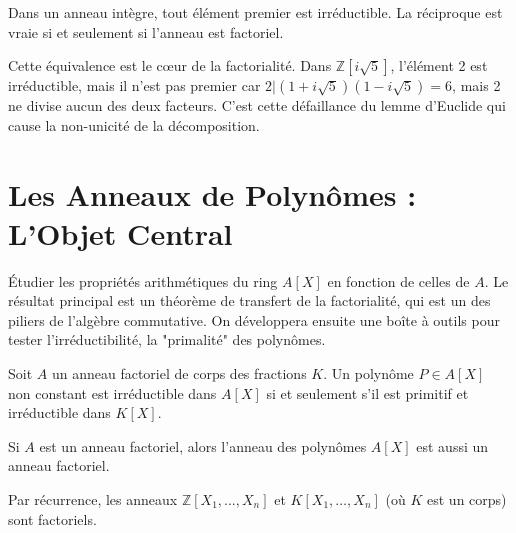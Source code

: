 \begin{proposition}
    Dans un anneau intègre, tout élément premier est irréductible. La réciproque est vraie si et seulement si l'anneau est factoriel.
\end{proposition}

\begin{remark}
    Cette équivalence est le cœur de la factorialité. Dans $\mathbb{Z}[i\sqrt{5}]$, l'élément 2 est irréductible, mais il n'est pas premier car $2 | (1+i\sqrt{5})(1-i\sqrt{5})=6$, mais 2 ne divise aucun des deux facteurs. C'est cette défaillance du lemme d'Euclide qui cause la non-unicité de la décomposition.
\end{remark}

\section{Les Anneaux de Polynômes : L'Objet Central}

\begin{objectif}
    Étudier les propriétés arithmétiques du ring $A[X]$ en fonction de celles de $A$. Le résultat principal est un théorème de transfert de la factorialité, qui est un des piliers de l'algèbre commutative. On développera ensuite une boîte à outils pour tester l'irréductibilité, la "primalité" des polynômes.
\end{objectif}

\begin{lemma}
    Soit $A$ un anneau factoriel de corps des fractions $K$. Un polynôme $P \in A[X]$ non constant est irréductible dans $A[X]$ si et seulement s'il est primitif et irréductible dans $K[X]$.
\end{lemma}

\begin{theorem}
    Si $A$ est un anneau factoriel, alors l'anneau des polynômes $A[X]$ est aussi un anneau factoriel.
\end{theorem}

\begin{corollary}
    Par récurrence, les anneaux $\mathbb{Z}[X_1, \dots, X_n]$ et $K[X_1, \dots, X_n]$ (où $K$ est un corps) sont factoriels.
\end{corollary}

